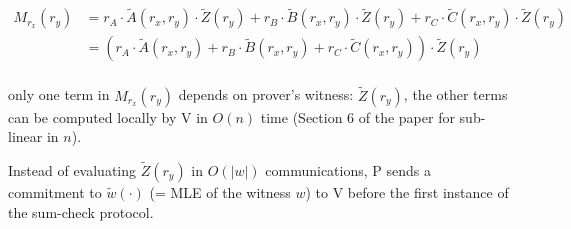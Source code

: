 \documentclass{article}
\theoremstyle{definition}
\begin{document}
\begin{align*}
M_{r_x}(r_y) &=
r_A \cdot \widetilde{A}(r_x, r_y) \cdot \widetilde{Z}(r_y)
+ r_B \cdot \widetilde{B}(r_x, r_y) \cdot \widetilde{Z}(r_y)
+ r_C \cdot \widetilde{C}(r_x, r_y) \cdot \widetilde{Z}(r_y)\\
	     &=
	     (r_A \cdot \widetilde{A}(r_x, r_y)
+ r_B \cdot \widetilde{B}(r_x, r_y)
+ r_C \cdot \widetilde{C}(r_x, r_y)) \cdot \widetilde{Z}(r_y)\\
\end{align*}

only one term in $M_{r_x}(r_y)$ depends on prover's witness: $\widetilde{Z}(r_y)$, the other terms can be computed locally by V in $O(n)$ time (Section 6 of the paper for sub-linear in $n$).

Instead of evaluating $\widetilde{Z}(r_y)$ in $O(|w|)$ communications, P sends a commitment to $\widetilde{w}(\cdot)$ (= MLE of the witness $w$) to V before the first instance of the sum-check protocol.
\end{document}
